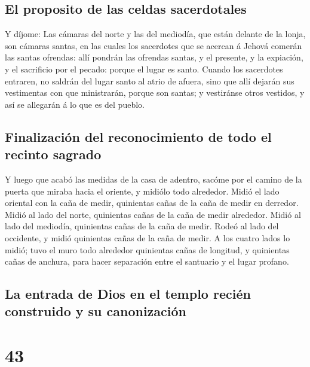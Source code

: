 \hypertarget{el-proposito-de-las-celdas-sacerdotales}{%
\subsection{El proposito de las celdas
sacerdotales}\label{el-proposito-de-las-celdas-sacerdotales}}

 Y díjome: Las cámaras del norte y las del mediodía, que
están delante de la lonja, son cámaras santas, en las cuales los
sacerdotes que se acercan á Jehová comerán las santas ofrendas: allí
pondrán las ofrendas santas, y el presente, y la expiación, y el
sacrificio por el pecado: porque el lugar es santo.  Cuando
los sacerdotes entraren, no saldrán del lugar santo al atrio de afuera,
sino que allí dejarán sus vestimentas con que ministrarán, porque son
santas; y vestiránse otros vestidos, y así se allegarán á lo que es del
pueblo.

\hypertarget{finalizaciuxf3n-del-reconocimiento-de-todo-el-recinto-sagrado}{%
\subsection{Finalización del reconocimiento de todo el recinto
sagrado}\label{finalizaciuxf3n-del-reconocimiento-de-todo-el-recinto-sagrado}}

 Y luego que acabó las medidas de la casa de adentro,
sacóme por el camino de la puerta que miraba hacia el oriente, y midiólo
todo alrededor.  Midió el lado oriental con la caña de
medir, quinientas cañas de la caña de medir en derredor. 
Midió al lado del norte, quinientas cañas de la caña de medir alrededor.
 Midió al lado del mediodía, quinientas cañas de la caña de
medir.  Rodeó al lado del occidente, y midió quinientas
cañas de la caña de medir.  A los cuatro lados lo midió;
tuvo el muro todo alrededor quinientas cañas de longitud, y quinientas
cañas de anchura, para hacer separación entre el santuario y el lugar
profano.

\hypertarget{la-entrada-de-dios-en-el-templo-reciuxe9n-construido-y-su-canonizaciuxf3n}{%
\subsection{La entrada de Dios en el templo recién construido y su
canonización}\label{la-entrada-de-dios-en-el-templo-reciuxe9n-construido-y-su-canonizaciuxf3n}}

\hypertarget{section-42}{%
\section{43}\label{section-42}}

